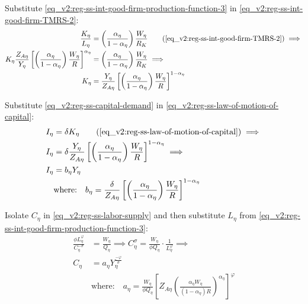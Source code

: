 \documentclass[../thesis.tex]{subfiles}
\begin{document}

Substitute \ref{eq_v2:reg-ss-int-good-firm-production-function-3} in \ref{eq_v2:reg-ss-int-good-firm-TMRS-2}:
\begin{align}
	\frac{K_{\eta}}{L_{\eta}} &= \left( \frac{{\alpha_{\eta}}}{1-\alpha_{\eta}} \right) \frac{W_{\eta}}{R_{K}} \tag{\ref{eq_v2:reg-ss-int-good-firm-TMRS-2}} \implies \\
	K_{\eta} \frac{Z_{A\eta}}{Y_{\eta}} \left[ \left( \frac{\alpha_{\eta}}{1-\alpha_{\eta}} \right) \frac{W_{\eta}}{R} \right]^{\alpha_{\eta}} &= \left( \frac{{\alpha_{\eta}}}{1-\alpha_{\eta}} \right) \frac{W_{\eta}}{R_{K}} \implies \nonumber \\
	K_{\eta} &= \frac{Y_{\eta}}{Z_{A\eta}} \left[ \left( \frac{{\alpha_{\eta}}}{1-\alpha_{\eta}} \right) \frac{W_{\eta}}{R} \right]^{1 - \alpha_{\eta}} \label{eq_v2:reg-ss-capital-demand}
\end{align}


Substitute \ref{eq_v2:reg-ss-capital-demand} in \ref{eq_v2:reg-ss-law-of-motion-of-capital}:
\begin{align}
	I_{\eta} &= \delta K_{\eta} \tag{\ref{eq_v2:reg-ss-law-of-motion-of-capital}} \implies \\
	I_{\eta} &= \delta \frac{Y_{\eta}}{Z_{A\eta}} \left[ \left( \frac{{\alpha_{\eta}}}{1-\alpha_{\eta}} \right) \frac{W_{\eta}}{R} \right]^{1 - \alpha_{\eta}} \implies \\
	I_{\eta} &= b_{\eta} Y_{\eta} \label{eq_v2:reg-ss-law-of-motion-of-capital-2} \\
	& \text{where:} \quad b_{\eta} = \frac{\delta}{Z_{A\eta}} \left[ \left( \frac{{\alpha_{\eta}}}{1-\alpha_{\eta}} \right) \frac{W_{\eta}}{R} \right]^{1 - \alpha_{\eta}} \label{eq_v2:reg-ss-b-eta}
\end{align}

	
	Isolate $C_{\eta}$ in \ref{eq_v2:reg-ss-labor-supply} and then substitute $L_{\eta}$ from \ref{eq_v2:reg-ss-int-good-firm-production-function-3}:
	\begin{align}
		\frac{\phi L_{\eta}^{\varphi}}{C_{\eta}^{-\sigma}} &= \frac{W_{\eta}}{Q_{\eta}} \implies C_{\eta}^{\sigma} = \frac{W_{\eta}}{\phi Q_{\eta}} \cdot \frac{1}{L_{\eta}^{\varphi}} \implies \nonumber\\
		C_{\eta} &= a_{\eta} Y_{\eta}^{\frac{-\varphi}{\sigma}} \label{eq_v2:reg-ss-consumption} \\
		& \text{where:} \quad a_{\eta} = \frac{W_{\eta}}{\phi Q_{\eta}} \left[ Z_{A\eta} \left( \frac{\alpha_{\eta} W_{\eta}}{(1 - \alpha_{\eta}) R} \right)^{\alpha_{\eta}} \right]^{\varphi} \label{eq_v2:reg-ss-a-eta}
	\end{align}
\end{document}
